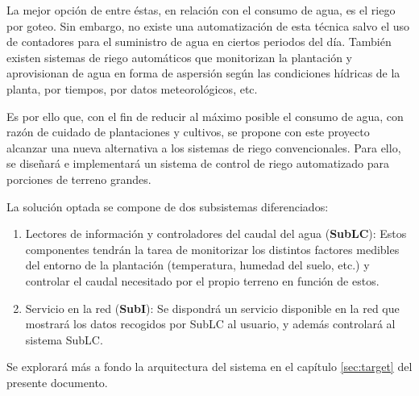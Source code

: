 La mejor opción de entre éstas, en relación con el consumo de agua, es el riego por goteo. Sin embargo, no existe una automatización de esta técnica salvo el uso de contadores para el suministro de agua en ciertos periodos del día. También existen sistemas de riego automáticos que monitorizan la plantación y aprovisionan de agua en forma de aspersión según las condiciones hídricas de la planta, por tiempos, por datos meteorológicos, etc.\newline

Es por ello que, con el fin de reducir al máximo posible el consumo de agua, con razón de cuidado de plantaciones y cultivos, se propone con este proyecto alcanzar una nueva alternativa a los sistemas de riego convencionales. Para ello, se diseñará e implementará un sistema de control de riego automatizado para porciones de terreno grandes.\newline

La solución optada se compone de dos subsistemas diferenciados:
\begin{enumerate}
    \item Lectores de información y controladores del caudal del agua ({\bfseries SubLC}): Estos componentes tendrán la tarea de monitorizar los distintos factores medibles del entorno de la plantación (temperatura, humedad del suelo, etc.) y controlar el caudal necesitado por el propio terreno en función de estos.
    \item Servicio en la red ({\bfseries SubI}): Se dispondrá un servicio disponible en la red que mostrará los datos recogidos por SubLC al usuario, y además controlará al sistema SubLC.
\end{enumerate}

Se explorará más a fondo la arquitectura del sistema en el capítulo \ref{sec:target} del presente documento.
